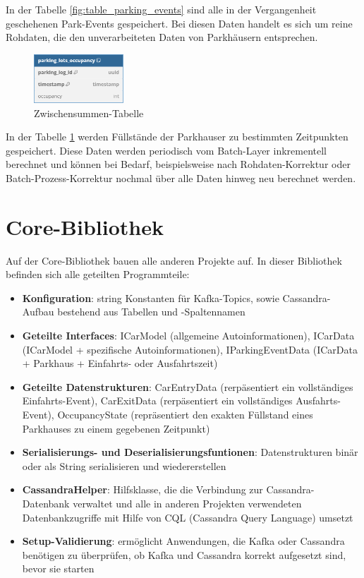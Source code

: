 In der Tabelle \ref{fig:table_parking_events} sind alle in der Vergangenheit geschehenen Park-Events gespeichert.
Bei diesen Daten handelt es sich um reine Rohdaten, die den unverarbeiteten Daten von Parkhäusern entsprechen.

\begin{figure}[h!]%
    \centering%
    \includegraphics[width=0.3\textwidth]{Graphics/occupancy.png}%
    \caption{Zwischensummen-Tabelle}%
    \label{fig:table_occupancy}
\end{figure}%

In der Tabelle \ref{fig:table_occupancy} werden Füllstände der Parkhauser zu bestimmten Zeitpunkten gespeichert.
Diese Daten werden periodisch vom Batch-Layer inkrementell berechnet und können bei Bedarf, beispielsweise nach Rohdaten-Korrektur oder Batch-Prozess-Korrektur nochmal über alle Daten hinweg neu berechnet werden.

\section{Core-Bibliothek}
Auf der Core-Bibliothek bauen alle anderen Projekte auf.
In dieser Bibliothek befinden sich alle geteilten Programmteile:
\begin{itemize}
    \item \textbf{Konfiguration}: string Konstanten für Kafka-Topics, sowie Cassandra-Aufbau bestehend aus Tabellen und -Spaltennamen
    \item \textbf{Geteilte Interfaces}: ICarModel (allgemeine Autoinformationen), ICarData (ICarModel + spezifische Autoinformationen), IParkingEventData (ICarData + Parkhaus + Einfahrts- oder Ausfahrtszeit)
    \item \textbf{Geteilte Datenstrukturen}: CarEntryData (rerpäsentiert ein vollständiges Einfahrts-Event), CarExitData (rerpäsentiert ein vollständiges Ausfahrts-Event), OccupancyState (repräsentiert den exakten Füllstand eines Parkhauses zu einem gegebenen Zeitpunkt)
    \item \textbf{Serialisierungs- und Deserialisierungsfuntionen}: Datenstrukturen binär oder als String serialisieren und wiedererstellen
    \item \textbf{CassandraHelper}: Hilfsklasse, die die Verbindung zur Cassandra-Datenbank verwaltet und alle in anderen Projekten verwendeten Datenbankzugriffe mit Hilfe von CQL (Cassandra Query Language) umsetzt
    \item \textbf{Setup-Validierung}: ermöglicht Anwendungen, die Kafka oder Cassandra benötigen zu überprüfen, ob Kafka und Cassandra korrekt aufgesetzt sind, bevor sie starten
\end{itemize}


